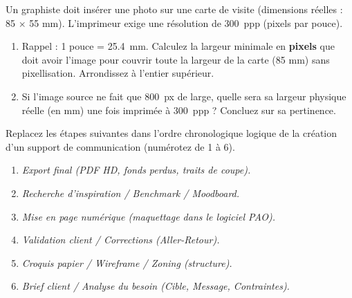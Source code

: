 \documentclass[11pt]{article}
\begin{document}
\begin{exercice}
Un graphiste doit insérer une photo sur une carte de visite (dimensions réelles : 85 $\times$ 55 mm). L'imprimeur exige une résolution de \SI{300}{ppp} (pixels par pouce).
\begin{enumerate}
    \item Rappel : 1 pouce = \SI{25,4}{mm}. Calculez la largeur minimale en \textbf{pixels} que doit avoir l'image pour couvrir toute la largeur de la carte (85 mm) sans pixellisation. Arrondissez à l'entier supérieur.
    \item Si l'image source ne fait que \SI{800}{px} de large, quelle sera sa largeur physique réelle (en mm) une fois imprimée à \SI{300}{ppp} ? Concluez sur sa pertinence.
\end{enumerate}
\end{exercice}

\begin{exercice}
Replacez les étapes suivantes dans l'ordre chronologique logique de la création d'un support de communication (numérotez de 1 à 6).
\begin{enumerate}
    \item \textit{Export final (PDF HD, fonds perdus, traits de coupe).}
    \item \textit{Recherche d'inspiration / Benchmark / Moodboard.}
    \item \textit{Mise en page numérique (maquettage dans le logiciel PAO).}
    \item \textit{Validation client / Corrections (Aller-Retour).}
    \item \textit{Croquis papier / Wireframe / Zoning (structure).}
    \item \textit{Brief client / Analyse du besoin (Cible, Message, Contraintes).}
\end{enumerate}
\end{exercice}
\end{document}

